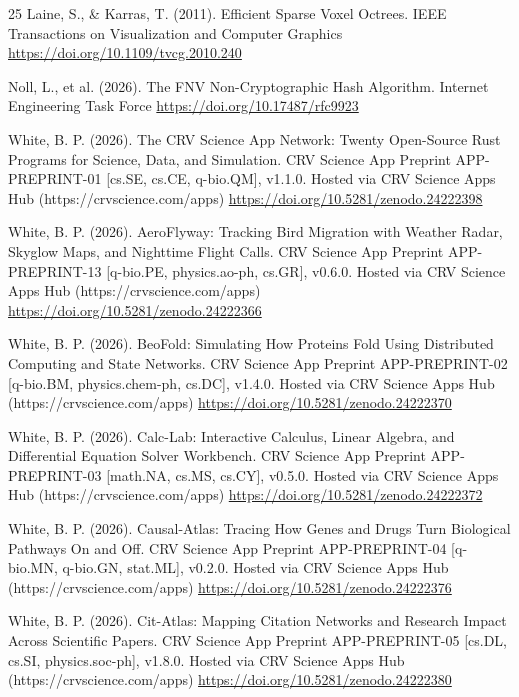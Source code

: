 \documentclass[10pt,letterpaper]{article}
\begin{document}
\begin{thebibliography}{25}
 Laine, S., \& Karras, T. (2011). Efficient Sparse Voxel Octrees. IEEE Transactions on Visualization and Computer Graphics \url{https://doi.org/10.1109/tvcg.2010.240}

 Noll, L., et al. (2026). The FNV Non-Cryptographic Hash Algorithm. Internet Engineering Task Force \url{https://doi.org/10.17487/rfc9923}

 White, B. P. (2026). The CRV Science App Network: Twenty Open-Source Rust Programs for Science, Data, and Simulation. CRV Science App Preprint APP-PREPRINT-01 [cs.SE, cs.CE, q-bio.QM], v1.1.0. Hosted via CRV Science Apps Hub (https://crvscience.com/apps) \url{https://doi.org/10.5281/zenodo.24222398}

 White, B. P. (2026). AeroFlyway: Tracking Bird Migration with Weather Radar, Skyglow Maps, and Nighttime Flight Calls. CRV Science App Preprint APP-PREPRINT-13 [q-bio.PE, physics.ao-ph, cs.GR], v0.6.0. Hosted via CRV Science Apps Hub (https://crvscience.com/apps) \url{https://doi.org/10.5281/zenodo.24222366}

 White, B. P. (2026). BeoFold: Simulating How Proteins Fold Using Distributed Computing and State Networks. CRV Science App Preprint APP-PREPRINT-02 [q-bio.BM, physics.chem-ph, cs.DC], v1.4.0. Hosted via CRV Science Apps Hub (https://crvscience.com/apps) \url{https://doi.org/10.5281/zenodo.24222370}

 White, B. P. (2026). Calc-Lab: Interactive Calculus, Linear Algebra, and Differential Equation Solver Workbench. CRV Science App Preprint APP-PREPRINT-03 [math.NA, cs.MS, cs.CY], v0.5.0. Hosted via CRV Science Apps Hub (https://crvscience.com/apps) \url{https://doi.org/10.5281/zenodo.24222372}

 White, B. P. (2026). Causal-Atlas: Tracing How Genes and Drugs Turn Biological Pathways On and Off. CRV Science App Preprint APP-PREPRINT-04 [q-bio.MN, q-bio.GN, stat.ML], v0.2.0. Hosted via CRV Science Apps Hub (https://crvscience.com/apps) \url{https://doi.org/10.5281/zenodo.24222376}

 White, B. P. (2026). Cit-Atlas: Mapping Citation Networks and Research Impact Across Scientific Papers. CRV Science App Preprint APP-PREPRINT-05 [cs.DL, cs.SI, physics.soc-ph], v1.8.0. Hosted via CRV Science Apps Hub (https://crvscience.com/apps) \url{https://doi.org/10.5281/zenodo.24222380}


\end{thebibliography}
\end{document}
